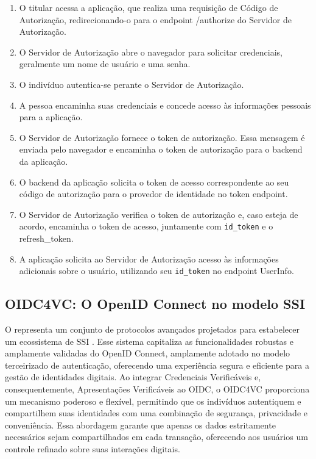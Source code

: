 \begin{enumerate}
    \item O titular acessa a aplicação, que realiza uma requisição de Código de Autorização, redirecionando-o para o endpoint /authorize do Servidor de Autorização.
    
    \item O Servidor de Autorização abre o navegador para solicitar credenciais, geralmente um nome de usuário e uma senha.
    
    \item O indivíduo autentica-se perante o Servidor de Autorização.
    
    \item A pessoa encaminha suas credenciais e concede acesso às informações pessoais para a aplicação.
    
    \item O Servidor de Autorização fornece o token de autorização. Essa mensagem é enviada pelo navegador e encaminha o token de autorização para o backend da aplicação.
    
    \item O backend da aplicação solicita o token de acesso correspondente ao seu código de autorização para o provedor de identidade no token endpoint.
    
    \item O Servidor de Autorização verifica o token de autorização e, caso esteja de acordo, encaminha o token de acesso, juntamente com \texttt{id\_token} e o refresh\_token.
    
    \item A aplicação solicita ao Servidor de Autorização acesso às informações adicionais sobre o usuário, utilizando seu \texttt{id\_token} no endpoint UserInfo.
\end{enumerate}


\subsection{OIDC4VC: O OpenID Connect no modelo SSI }\label{subsec:oidc4vc}

O  representa um conjunto de protocolos avançados projetados para estabelecer um ecossistema de \acs{SSI} \cite{OIDC4VCWhitepaper2022}. Esse sistema capitaliza as funcionalidades robustas e amplamente validadas do OpenID Connect, amplamente adotado no modelo terceirizado de autenticação, oferecendo uma experiência segura e eficiente para a gestão de identidades digitais. Ao integrar Credenciais Verificáveis e, consequentemente, Apresentações Verificáveis ao \acs{OIDC}, o \acs{OIDC4VC} proporciona um mecanismo poderoso e flexível, permitindo que os indivíduos autentiquem e compartilhem suas identidades com uma combinação de segurança, privacidade e conveniência.  Essa abordagem garante que apenas os dados estritamente necessários sejam compartilhados em cada transação, oferecendo aos usuários um controle refinado sobre suas interações digitais.

